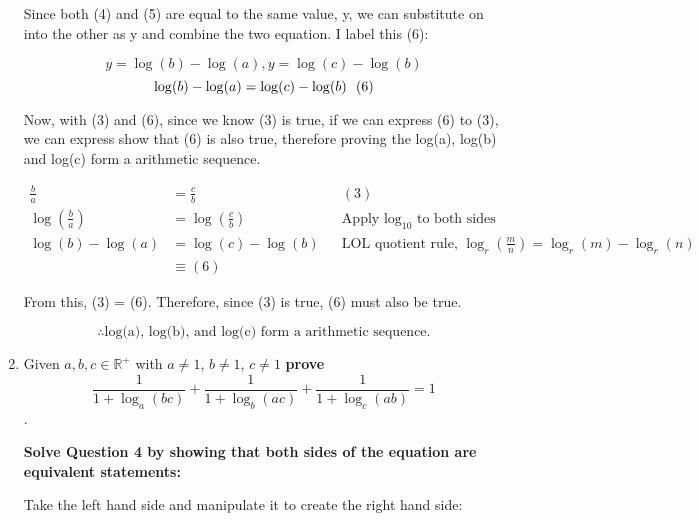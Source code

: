 \documentclass[12pt]{book}
\begin{document}
\begin{enumerate}
Since both (4) and (5) are equal to the same value, y, we can 
substitute on into the other as y and combine the two equation. 
I label this (6):

$$y = \log(b) - \log(a), y = \log(c) - \log(b)$$
$$\log(b) - \log(a) = \log(c) - \log(b) \text{\space \space (6)}$$

\newpage

Now, with (3) and (6), since we know (3) is true, if we can express (6) to (3), 
we can express show that (6) is also true, therefore proving the log(a), log(b) and log(c) 
form a arithmetic sequence.

\begin{align*}
    \frac{b}{a} &= \frac{c}{b} && (3) \\
    \log\left( \frac{b}{a} \right) &= \log\left( \frac{c}{b} \right) && \text{Apply } \log_10 \text{ to both sides} \\
    \log(b) - \log(a) &= \log(c) - \log(b) && \text{LOL quotient rule, } \log_r\left( \frac{m}{n} \right) = \log_r(m) - \log_r(n) \\
    & \equiv (6)
\end{align*}

From this, (3) = (6). Therefore, since (3) is true, (6) must also be true.

$$\boxed{\therefore \text{log(a), log(b), and log(c) form a arithmetic sequence.}}$$

\newpage


\item Given $a,b,c \in \mathbb{R^+}$ with $a\neq1$, $b\neq1$, $c\neq1$ \textbf{prove} $$\dfrac{1}{1+\log_a(bc)} + \dfrac{1}{1+\log_b(ac)} + \dfrac{1}{1+\log_c(ab)} = 1$$.

\vspace{0.5cm}
\textbf{Solve Question 4 by showing that both sides of the equation are equivalent statements:}

\vspace{0.2cm}
Take the left hand side and manipulate it to create the right hand side:


\end{enumerate}
\end{document}
